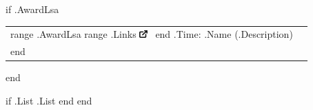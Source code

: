     {{ if .AwardLsa }}
        \begin{tabular}{@{}p{48mm} @{\hskip 0.2cm}p{1mm}@{}}
            {{range .AwardLsa}}%
                {{range .Links}}%
                \href{{print "{" . "}" }}{\includegraphics[width=3mm]{generator/internal/image/extlink.png}}~ %
                {{end}}%
                {{.Time}}: %
                {{.Name}} ({{.Description}})
                \\[5pt]%
            {{end}}%
        \end{tabular}
    {{ end }}

    {{ if .List }}
        {{.List}}
    {{ end }}
{{ end }}